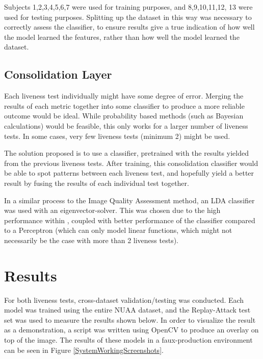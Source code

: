 \documentclass[12pt,a4paper]{article}
\begin{document}
            Subjects 1,2,3,4,5,6,7 were used for training purposes, and 8,9,10,11,12, 13 were used for testing purposes. Splitting up the dataset in this way was necessary to correctly assess the classifier,
            to ensure results give a true indication of how well the model learned the features, rather than how well the model learned the dataset.

    \subsection{Consolidation Layer}
        Each liveness test individually might have some degree of error. Merging the results of each metric together into some classifier to produce a more reliable outcome would be ideal.
        While probability based methods (such as Bayesian calculations) would be feasible, this only works for a larger number of liveness tests. In some cases, very few liveness tests (minimum 2)
        might be used. 

        The solution proposed is to use a classifier, pretrained with the results yielded from the previous liveness tests. After training, this consolidation classifier would be able to spot patterns
        between each liveness test, and hopefully yield a better result by fusing the results of each individual test together. 
        
        In a similar process to the Image Quality Assessment method, an LDA classifier was used with an eigenvector-solver. This was chosen due to the high performance within \cite{ImageQualityAssessmentTest},
        coupled with better performance of the classifier compared to a Perceptron (which can only model linear functions, which might not necessarily be the case with more than 2 liveness tests).
  
\section{Results}
    For both liveness tests, cross-dataset validation/testing was conducted. Each model was trained using the entire NUAA dataset, and the Replay-Attack test set
    was used to measure the results shown below. In order to visualize the result as a demonstration, a script was written using OpenCV to produce an overlay on top of the image.
    The results of these models in a faux-production environment can be seen in Figure \ref{SystemWorkingScreenshots}. 
\end{document}
